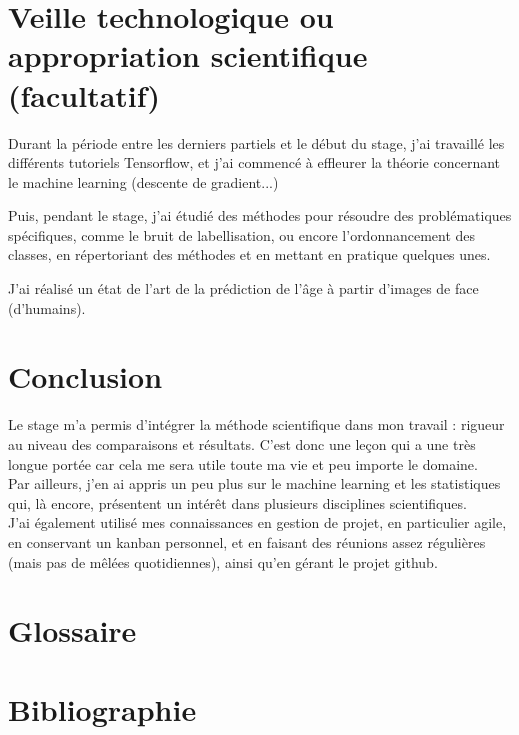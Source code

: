 \documentclass[a4paper,12pt]{article}
\begin{document}
\section{Veille technologique ou appropriation scientifique (facultatif)} 
Durant la période entre les derniers partiels et le début du stage, j'ai travaillé les différents tutoriels Tensorflow, et j'ai commencé à effleurer la théorie concernant le machine learning (descente de gradient...)\newline

Puis, pendant le stage, j'ai étudié des méthodes pour résoudre des problématiques spécifiques, comme le bruit de labellisation, ou encore l'ordonnancement des classes, en répertoriant des méthodes et en  mettant en pratique quelques unes. \newline

J'ai réalisé un état de l'art de la prédiction de l'âge à partir d'images de face (d'humains).



\section{Conclusion}
Le stage m'a permis d'intégrer la méthode scientifique dans mon travail : rigueur au niveau des comparaisons et résultats. C'est donc une leçon qui a une très longue portée car cela me sera utile toute ma vie et peu importe le domaine. \\

Par ailleurs, j'en ai appris un peu plus sur le machine learning et les statistiques qui, là encore, présentent un intérêt dans plusieurs disciplines scientifiques. \\

J'ai également utilisé mes connaissances en gestion de projet, en particulier agile, en conservant un kanban personnel, et en faisant des réunions assez régulières (mais pas de mêlées quotidiennes), ainsi qu'en gérant le projet github.


\section{Glossaire}
\clearpage
\printglossary[title={Glossaire}]


\listoffigures

\section{Bibliographie} 
\printbibliography[
heading=subbibintoc,
title={ }
] 
\end{document}
